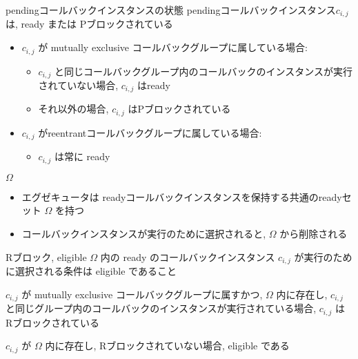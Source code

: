 \begin{frame}{pendingコールバックインスタンスの状態}
    pendingコールバックインスタンス$c_{i, j}$は, ready または Pブロックされている
    \begin{itemize}
        \item  $c_{i, j}$ が mutually exclusive コールバックグループに属している場合:
              \begin{itemize}
                  \item $c_{i, j}$ と同じコールバックグループ内のコールバックのインスタンスが実行されていない場合, $c_{i, j}$ はready
                  \item それ以外の場合, $c_{i, j}$ はPブロックされている
              \end{itemize}
        \item  $c_{i, j}$ がreentrantコールバックグループに属している場合:
              \begin{itemize}
                  \item $c_{i, j}$ は常に ready
              \end{itemize}
    \end{itemize}
\end{frame}

\begin{frame}{$\Omega$}
    \begin{itemize}
        \item エグゼキュータは readyコールバックインスタンスを保持する共通のreadyセット $\Omega$ を持つ
        \item コールバックインスタンスが実行のために選択されると, $\Omega$ から削除される
    \end{itemize}
\end{frame}

\begin{frame}{Rブロック, eligible}
    $\Omega$ 内の ready のコールバックインスタンス $c_{i, j}$ が実行のために選択される条件は eligible であること
    \begin{definition}[Rブロック]
        $c_{i, j}$ が mutually exclusive コールバックグループに属すかつ, $\Omega$ 内に存在し, $c_{i, j}$ と同じグループ内のコールバックのインスタンスが実行されている場合, $c_{i, j}$ は Rブロックされている
    \end{definition}
    \begin{definition}[eligible]
        $c_{i, j}$ が $\Omega$ 内に存在し, Rブロックされていない場合, eligible である
    \end{definition}
\end{frame}

